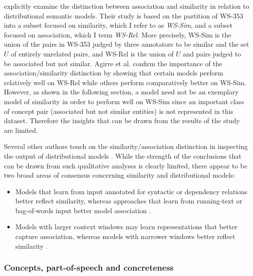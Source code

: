 \cite{agirre2009study} explicitly examine the distinction between association and similarity in relation to distributional semantic models. Their study is based on the partition of WS-353 into a subset focused on similarity, which I refer to as \emph{WS-Sim}, and a subset focused on association, which I term \emph{WS-Rel}. More precisely, WS-Sim is the union of the pairs in WS-353 judged by three annotators to be similar and the set \(U\) of entirely unrelated pairs, and WS-Rel is the union of \(U\) and pairs judged to be associated but not similar. Agirre et al. confirm the importance of the association/similarity distinction by showing that certain models perform relatively well on WS-Rel while others perform comparatively better on WS-Sim. However, as shown in the following section, a model need not be an exemplary model of similarity in order to perform well on WS-Sim since an important class of concept pair (associated but not similar entities) is not represented in this dataset. Therefore the insights that can be drawn from the results of the \cite{agirre2009study} study are limited.  

Several other authors touch on the similarity/association distinction in inspecting the output of distributional models \cite{andrews2009integrating,kiela2014systematic,levy2014dependency}. While the strength of the conclusions that can be drawn from such qualitative analyses is clearly limited, there appear to be two broad areas of consensus concerning similarity and distributional models: 

\begin{itemize}

\item Models that learn from input annotated for syntactic or dependency relations better reflect similarity, whereas approaches that learn from running-text or bag-of-words input better model association \cite{agirre2009study,levy2014dependency}. 

\item Models with larger context windows may learn representations that better capture association, whereas models with narrower windows better reflect similarity \cite{agirre2009study,kiela2014systematic}.

\end{itemize}

\subsubsection{Concepts, part-of-speech and concreteness}


